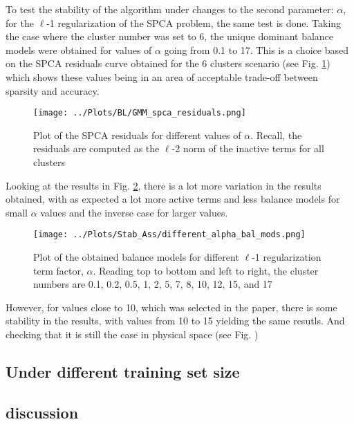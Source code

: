 \documentclass[12pt]{report} %
\begin{document}
To test the stability of the algorithm under changes to the second parameter: $\alpha$, for the $\ell$-1 regularization of the SPCA problem, the same test is done. Taking the case where the cluster number was set to 6, the unique dominant balance models were obtained for values of $\alpha$ going from 0.1 to 17. This is a choice based on the SPCA residuals curve obtained for the 6 clusters scenario (see Fig. \ref{fig:spca_residuals}) which shows these values being in an area of acceptable trade-off between sparsity and accuracy.

\begin{figure}
  \centering
  \texttt{[image: ../Plots/BL/GMM\_spca\_residuals.png]}
  \caption{Plot of the SPCA residuals for different values of $\alpha$. Recall, the residuals are computed as the $\ell$-2 norm of the inactive terms for all clusters}
  \label{fig:spca_residuals}
\end{figure}

\newpage

Looking at the results in Fig. \ref{fig:diff_alpha_bal_mods}, there is a lot more variation in the results obtained, with as expected a lot more active terms and less balance models for small $\alpha$ values and the inverse case for larger values.

\begin{figure}[htbp]
  \centering
  \texttt{[image: ../Plots/Stab\_Ass/different\_alpha\_bal\_mods.png]}
  \caption{Plot of the obtained balance models for different $\ell$-1 regularization term factor, $\alpha$. Reading top to bottom and left to right, the cluster numbers are 0.1, 0.2, 0.5, 1, 2, 5, 7, 8, 10, 12, 15, and 17}
  \label{fig:diff_alpha_bal_mods}
\end{figure}

However, for values close to 10, which was selected in the paper, there is some stability in the results, with values from 10 to 15 yielding the same resutls. And checking that it is still the case in physical space (see Fig. )

\begin{figure}[htbp]
\end{figure}

\subsection{Under different training set size}

\subsection{discussion}
\end{document}
